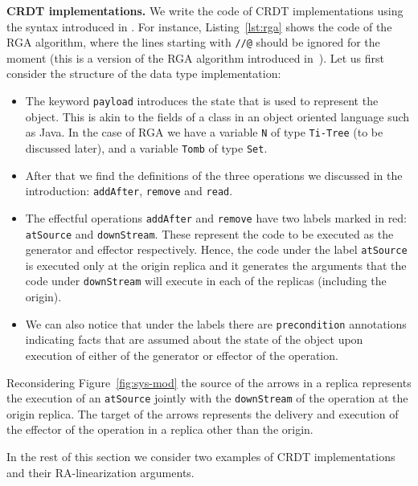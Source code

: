 \noindent
{\bf CRDT implementations.}
We write the code of CRDT implementations using the syntax introduced in \citet{ShapiroPBZ11}.
%
For instance, Listing~\ref{lst:rga} shows the code of the RGA algorithm, 
where the lines starting with \lstinline|//@| should be ignored for the moment 
(this is a version of the RGA algorithm introduced in~\cite{AttiyaBGMYZ16}).
%
Let us first consider the structure of the data type implementation:
\begin{itemize}
\item The keyword \lstinline|payload| introduces the state that is
  used to represent the object. This is akin to the fields of a class
  in an object oriented language such as Java. In the
  case of RGA we have a variable \lstinline|N| of type
  \lstinline|Ti-Tree| (to be discussed later), and a variable
  \lstinline|Tomb| of type \lstinline|Set|.
\item After that we find the definitions of the three operations we
  discussed in the introduction: \lstinline|addAfter|,
  \lstinline|remove| and \lstinline|read|.
\item The effectful operations \lstinline|addAfter| and
  \lstinline|remove| have two labels marked in red:
  \lstinline|atSource| and \lstinline|downStream|.
  These represent the code to be executed as the generator and
  effector respectively. Hence, the code under the label
  \lstinline|atSource| is executed only at the origin replica and it
  generates the arguments that the code under \lstinline|downStream|
  will execute in each of the replicas (including the origin).
\item We can also notice that under the labels there are
  \lstinline|precondition| annotations indicating facts that are
  assumed about the state of the object upon execution of either of
  the generator or effector of the operation.
\end{itemize}
Reconsidering Figure~\ref{fig:sys-mod} the
source of the arrows in a replica represents the execution of an
\lstinline|atSource| jointly with the \lstinline|downStream| of the
operation at the origin replica.
%
The target of the arrows represents the delivery and execution of the
effector of the operation in a replica other than the origin.


In the rest of this section we consider two examples of CRDT
implementations and their RA-linearization arguments.

